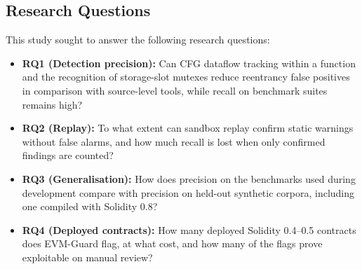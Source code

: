 \documentclass[pdflatex,sn-mathphys]{sn-jnl}
\theoremstyle{thmstyletwo}
\theoremstyle{thmstyletwo}
\begin{document}
\subsection{Research Questions}\label{sec:intro:rqs}
This study sought to answer the following research questions:
\begin{itemize}
    \item \textbf{RQ1 (Detection precision):} Can CFG dataflow tracking within a function and the recognition of storage-slot mutexes reduce reentrancy false positives in comparison with source-level tools, while recall on benchmark suites remains high?
    \item \textbf{RQ2 (Replay):} To what extent can sandbox replay confirm static warnings without false alarms, and how much recall is lost when only confirmed findings are counted?
    \item \textbf{RQ3 (Generalisation):} How does precision on the benchmarks used during development compare with precision on held-out synthetic corpora, including one compiled with Solidity 0.8?
    \item \textbf{RQ4 (Deployed contracts):} How many deployed Solidity 0.4--0.5 contracts does EVM-Guard flag, at what cost, and how many of the flags prove exploitable on manual review?
\end{itemize}
\end{document}
